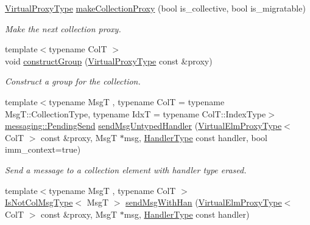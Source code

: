 \begin{DoxyCompactItemize}
\hyperlink{namespacevt_a1b417dd5d684f045bb58a0ede70045ac}{Virtual\+Proxy\+Type} \hyperlink{structvt_1_1vrt_1_1collection_1_1_collection_manager_ac0682938bc90285eb8c476d6898bf280}{make\+Collection\+Proxy} (bool is\+\_\+collective, bool is\+\_\+migratable)
\begin{DoxyCompactList}\small\item\em Make the next collection proxy. \end{DoxyCompactList}\item 
{\footnotesize template$<$typename ColT $>$ }\\void \hyperlink{structvt_1_1vrt_1_1collection_1_1_collection_manager_a526e4c6aca18333f508e34a24cabc712}{construct\+Group} (\hyperlink{namespacevt_a1b417dd5d684f045bb58a0ede70045ac}{Virtual\+Proxy\+Type} const \&proxy)
\begin{DoxyCompactList}\small\item\em Construct a group for the collection. \end{DoxyCompactList}\item 
{\footnotesize template$<$typename MsgT , typename ColT  = typename Msg\+T\+::\+Collection\+Type, typename IdxT  = typename Col\+T\+::\+Index\+Type$>$ }\\\hyperlink{structvt_1_1messaging_1_1_pending_send}{messaging\+::\+Pending\+Send} \hyperlink{structvt_1_1vrt_1_1collection_1_1_collection_manager_a6411b315ab0a4bfa0293db456077d5cc}{send\+Msg\+Untyped\+Handler} (\hyperlink{namespacevt_1_1vrt_a620a5c8c59d13e513f690c74b4af516f}{Virtual\+Elm\+Proxy\+Type}$<$ ColT $>$ const \&proxy, MsgT $\ast$msg, \hyperlink{namespacevt_af64846b57dfcaf104da3ef6967917573}{Handler\+Type} const handler, bool imm\+\_\+context=true)
\begin{DoxyCompactList}\small\item\em Send a message to a collection element with handler type erased. \end{DoxyCompactList}\item 
{\footnotesize template$<$typename MsgT , typename ColT $>$ }\\\hyperlink{structvt_1_1vrt_1_1collection_1_1_collection_manager_ae376deeefd4f89a0b1c93849977715d9}{Is\+Not\+Col\+Msg\+Type}$<$ MsgT $>$ \hyperlink{structvt_1_1vrt_1_1collection_1_1_collection_manager_ae3ae6f30c8b4aa2c8b50494127cbd77b}{send\+Msg\+With\+Han} (\hyperlink{namespacevt_1_1vrt_a620a5c8c59d13e513f690c74b4af516f}{Virtual\+Elm\+Proxy\+Type}$<$ ColT $>$ const \&proxy, MsgT $\ast$msg, \hyperlink{namespacevt_af64846b57dfcaf104da3ef6967917573}{Handler\+Type} const handler)

\end{DoxyCompactItemize}

